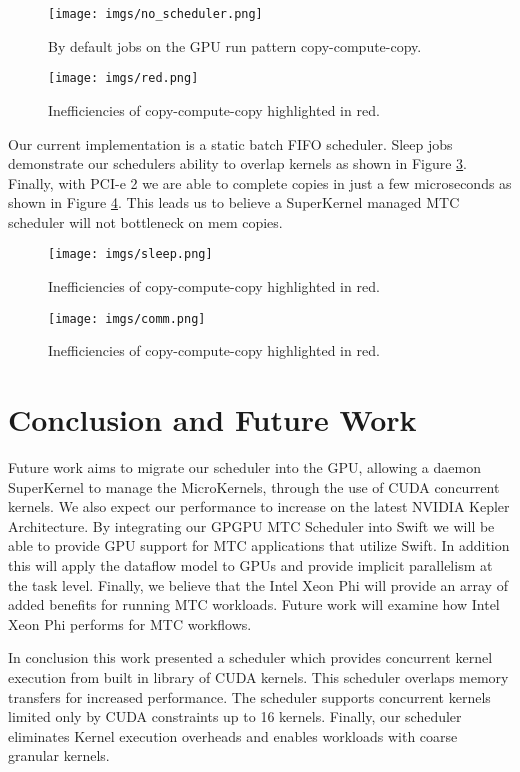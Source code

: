 \documentclass[conference]{IEEEtran}
\begin{document}
\begin{figure}[h]
\centering\texttt{[image: imgs/no\_scheduler.png]}
\caption{By default jobs on the GPU run pattern copy-compute-copy.}
\label{fig:no_scheduler}
\end{figure}

\begin{figure}[h]
\centering\texttt{[image: imgs/red.png]}
\caption{Inefficiencies of copy-compute-copy highlighted in red.}
\label{fig:red}
\end{figure}

Our current implementation is a static batch FIFO scheduler. Sleep jobs demonstrate our schedulers ability to overlap kernels as shown in Figure \ref{fig:sleep}. Finally, with PCI-e 2 we are able to complete copies in just a few microseconds as shown in Figure \ref{fig:comm}. This leads us to believe a SuperKernel managed MTC scheduler will not bottleneck on mem copies.

\begin{figure}[h]
\centering\texttt{[image: imgs/sleep.png]}
\caption{Inefficiencies of copy-compute-copy highlighted in red.}
\label{fig:sleep}
\end{figure}

\begin{figure}[h]
\centering\texttt{[image: imgs/comm.png]}
\caption{Inefficiencies of copy-compute-copy highlighted in red.}
\label{fig:comm}
\end{figure}


\section{Conclusion and Future Work}
Future work aims to migrate our scheduler into the GPU, allowing a daemon SuperKernel to manage the MicroKernels, through the use of CUDA concurrent kernels. We also expect our performance to increase on the latest NVIDIA Kepler Architecture. \cite{NVIDIA_Kepler} By integrating our GPGPU MTC Scheduler into Swift we will be able to provide GPU support for MTC applications that utilize Swift. In addition this will apply the dataflow model to GPUs and provide implicit parallelism at the task level. Finally, we believe that the Intel Xeon Phi will provide an array of added benefits for running MTC workloads. Future work will examine how Intel Xeon Phi performs for MTC workflows.

In conclusion this work presented a scheduler which provides concurrent kernel execution from built in library of CUDA kernels. This scheduler overlaps memory transfers for increased performance. The scheduler supports concurrent kernels limited only by CUDA constraints up to 16 kernels. Finally, our scheduler eliminates Kernel execution overheads and enables workloads with coarse granular kernels.



\end{document}
